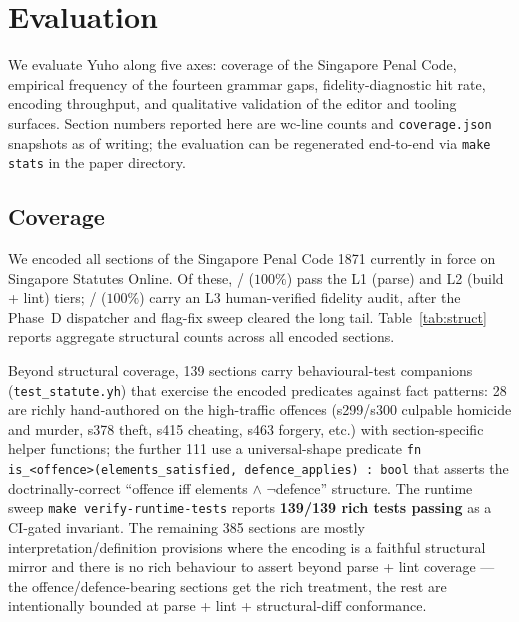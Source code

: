 \section{Evaluation}
\label{sec:evaluation}

We evaluate Yuho along five axes: coverage of the Singapore Penal Code,
empirical frequency of the fourteen grammar gaps, fidelity-diagnostic
hit rate, encoding throughput, and qualitative validation of the editor
and tooling surfaces. Section numbers reported here are wc-line counts
and \texttt{coverage.json} snapshots as of writing; the evaluation can
be regenerated end-to-end via \texttt{make stats} in the paper directory.

\subsection{Coverage}
\label{subsec:coverage_eval}

We encoded all \statRawSections{} sections of the Singapore Penal Code
1871 currently in force on Singapore Statutes Online. Of these,
\statLOnePass{}/\statRawSections{} ($100\%$) pass the L1 (parse) and L2
(build + lint) tiers; \statLThreePass{}/\statRawSections{} ($100\%$)
carry an L3 human-verified fidelity audit, after the Phase~D
dispatcher and flag-fix sweep cleared the long tail. Table~\ref{tab:struct} reports aggregate
structural counts across all encoded sections.

Beyond structural coverage, 139 sections carry behavioural-test
companions (\texttt{test\_statute.yh}) that exercise the encoded
predicates against fact patterns: 28 are richly hand-authored on the
high-traffic offences (s299/s300 culpable homicide and murder, s378
theft, s415 cheating, s463 forgery, etc.) with section-specific
helper functions; the further 111 use a universal-shape predicate
\texttt{fn is\_<offence>(elements\_satisfied, defence\_applies) :
bool} that asserts the doctrinally-correct ``offence iff elements
$\land$ $\neg$defence'' structure. The runtime sweep
\texttt{make verify-runtime-tests} reports
\textbf{139/139 rich tests passing} as a CI-gated invariant.
The remaining 385 sections are
mostly interpretation/definition provisions where the encoding is a
faithful structural mirror and there is no rich behaviour to assert
beyond parse + lint coverage --- the offence/defence-bearing sections
get the rich treatment, the rest are intentionally bounded at
parse + lint + structural-diff conformance.

